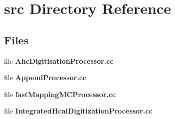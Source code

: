 \section{src Directory Reference}
\label{dir_16dfc7159b352fda5473af5ea502a1d1}
\subsection*{Files}
\begin{DoxyCompactItemize}
\item 
file {\bfseries Ahc\-Digitisation\-Processor.\-cc}
\item 
file {\bfseries Append\-Processor.\-cc}
\item 
file {\bfseries fast\-Mapping\-M\-C\-Processor.\-cc}
\item 
file {\bfseries Integrated\-Hcal\-Digitization\-Processor.\-cc}
\end{DoxyCompactItemize}
